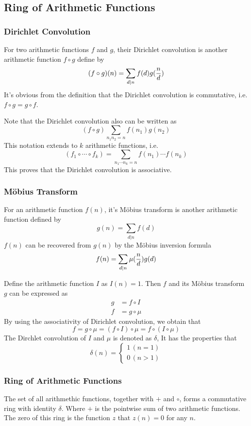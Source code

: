 \documentclass{article}
\begin{document}
\subsection{Ring of Arithmetic Functions}
\subsubsection*{Dirichlet Convolution}
For two arithmetic functions $f$ and $g$, their Dirichlet convolution
is another arithmetic function $f \circ g$ define by
$$(f \circ g)(n) = \sum_{d \vert n} f(d) g({n \over d})$$
It's obvious from the definition that the Dirichlet convolution is commutative,
i.e. $f \circ g = g \circ f$.

Note that the Dirichlet convolution also can be written as
$$(f \circ g) \sum_{n_1 n_2 = n} f(n_1) g(n_2)$$
This notation extends to $k$ arithmetic functions,
i.e. $$(f_1 \circ \cdots \circ f_k) = \sum_{n_1 \cdots n_k = n} f(n_1) \cdots f(n_k)$$
This proves that the Dirichlet convolution is associative.

\subsubsection*{M\"obius Transform}
For an arithmetic function $f(n)$, it's M\"obius transform is another arithmetic function
defined by $$g(n) = \sum_{d \vert n} f(d)$$
$f(n)$ can be recovered from $g(n)$ by the M\"obius inversion formula
$$f(n) = \sum_{d \vert n} \mu({n \over d}) g(d)$$

Define the arithmetic function $I$ as $I(n) = 1$.
Then $f$ and its M\"obius transform $g$ can be expressed as
\begin{align*}
  g &= f \circ I \\
  f &= g \circ \mu
\end{align*}
By using the associativity of Dirichlet convolution, we obtain that
$$f = g \circ \mu = (f \circ I) \circ \mu = f \circ (I \circ \mu)$$
The Dirchlet convolution of $I$ and $\mu$ is denoted as $\delta$,
It has the properties that
\begin{equation*}
  \delta(n) =
  \begin{cases}
    1 \, (n = 1) \\
    0 \, (n > 1)
  \end{cases}
\end{equation*}

\subsubsection{Ring of Arithmetic Functions}
The set of all arithmethic functions, together with $+$ and $\circ$, forms a commutative ring with identity $\delta$.
Where $+$ is the pointwise sum of two arithmetic functions.
The zero of this ring is the function $z$ that $z(n) = 0$ for any $n$.
\end{document}
